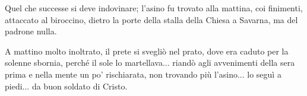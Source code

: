 Quel che successe si deve indovinare; l'asino fu trovato alla mattina, coi finimenti, attaccato al biroccino, dietro la porte della stalla della Chiesa a Savarna, ma del padrone nulla.

A mattino molto inoltrato, il prete si svegliò nel prato, dove era caduto per la solenne sbornia, perché il sole lo martellava... riandò agli avvenimenti della sera prima e nella mente un po' rischiarata, non trovando più l'asino... lo seguì a piedi... da buon soldato di Cristo.














































%

